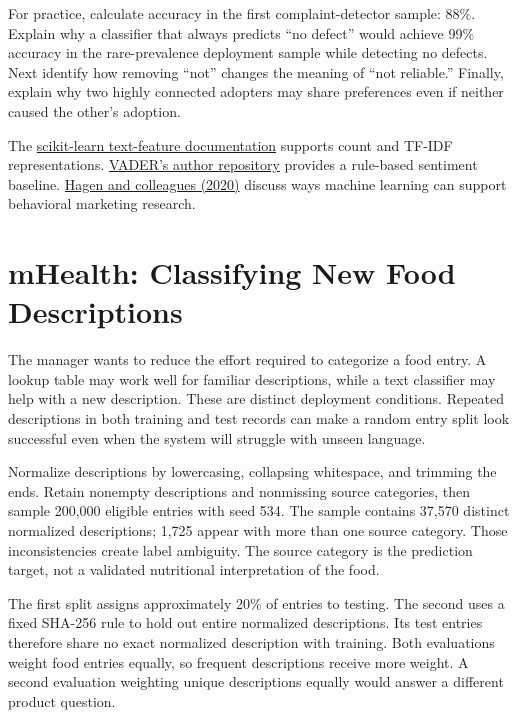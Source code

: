For practice, calculate accuracy in the first complaint-detector sample:
88\%. Explain why a classifier that always predicts ``no defect'' would
achieve 99\% accuracy in the rare-prevalence deployment sample while
detecting no defects. Next identify how removing ``not'' changes the
meaning of ``not reliable.'' Finally, explain why two highly connected
adopters may share preferences even if neither caused the other's
adoption.

The
\href{https://scikit-learn.org/stable/modules/feature_extraction.html\#text-feature-extraction}{scikit-learn
text-feature documentation} supports count and TF-IDF representations.
\href{https://github.com/cjhutto/vaderSentiment}{VADER's author
repository} provides a rule-based sentiment baseline.
\href{https://doi.org/10.1007/s11002-020-09535-7}{Hagen and colleagues
(2020)} discuss ways machine learning can support behavioral marketing
research.

\hypertarget{M05-mhealth-classifying-new-food-descriptions}{%
\section{mHealth: Classifying New Food
Descriptions}\label{M05-mhealth-classifying-new-food-descriptions}}

\noindent The manager wants to reduce the effort required to categorize a food
entry. A lookup table may work well for familiar descriptions, while a
text classifier may help with a new description. These are distinct
deployment conditions. Repeated descriptions in both training and test
records can make a random entry split look successful even when the
system will struggle with unseen language.

Normalize descriptions by lowercasing, collapsing whitespace, and
trimming the ends. Retain nonempty descriptions and nonmissing source
categories, then sample 200,000 eligible entries with seed 534. The
sample contains 37,570 distinct normalized descriptions; 1,725 appear
with more than one source category. Those inconsistencies create label
ambiguity. The source category is the prediction target, not a validated
nutritional interpretation of the food.

The first split assigns approximately 20\% of entries to testing. The
second uses a fixed SHA-256 rule to hold out entire normalized
descriptions. Its test entries therefore share no exact normalized
description with training. Both evaluations weight food entries equally,
so frequent descriptions receive more weight. A second evaluation
weighting unique descriptions equally would answer a different product
question.

